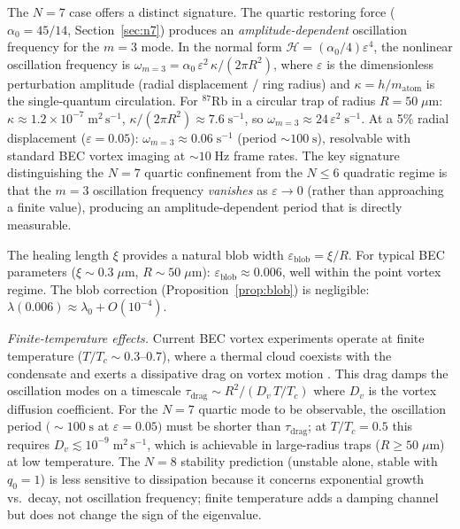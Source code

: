 The $N = 7$ case offers a distinct signature.  The quartic restoring
force ($\alpha_0 = 45/14$, Section~\ref{sec:n7}) produces an
\emph{amplitude-dependent} oscillation frequency for the $m = 3$ mode.
In the normal form $\mathcal{H} = (\alpha_0/4)\varepsilon^4$, the
nonlinear oscillation frequency is
$\omega_{m=3} = \alpha_0\,\varepsilon^2\,\kappa/(2\pi R^2)$, where
$\varepsilon$ is the dimensionless perturbation amplitude (radial
displacement / ring radius) and $\kappa = h/m_{\mathrm{atom}}$ is the
single-quantum circulation.  For $^{87}$Rb in a circular trap of
radius $R = 50\;\mu\mathrm{m}$:
$\kappa \approx 1.2\times 10^{-7}\;\mathrm{m^2\,s^{-1}}$,
$\kappa/(2\pi R^2) \approx 7.6\;\mathrm{s^{-1}}$, so
$\omega_{m=3} \approx 24\,\varepsilon^2\;\mathrm{s^{-1}}$.  At a
5\% radial displacement ($\varepsilon = 0.05$):
$\omega_{m=3} \approx 0.06\;\mathrm{s^{-1}}$ (period $\sim\!100\;\mathrm{s}$),
resolvable with standard BEC vortex imaging at $\sim\!10\;\mathrm{Hz}$
frame rates.  The key signature distinguishing the $N = 7$
quartic confinement from the $N \le 6$ quadratic regime is that the
$m = 3$ oscillation frequency \emph{vanishes} as $\varepsilon \to 0$
(rather than approaching a finite value), producing an
amplitude-dependent period that is directly measurable.

The healing length $\xi$ provides a natural blob width
$\varepsilon_{\mathrm{blob}} = \xi/R$.  For typical BEC parameters
($\xi \sim 0.3\;\mu\mathrm{m}$, $R \sim 50\;\mu\mathrm{m}$):
$\varepsilon_{\mathrm{blob}} \approx 0.006$, well within the point
vortex regime.  The blob correction (Proposition~\ref{prop:blob}) is
negligible: $\lambda(0.006) \approx \lambda_0 + O(10^{-4})$.

\emph{Finite-temperature effects.}  Current BEC vortex experiments
operate at finite temperature ($T/T_c \sim 0.3$--$0.7$), where a
thermal cloud coexists with the condensate and exerts a dissipative
drag on vortex motion \citep{Fetter2009}.  This drag damps the
oscillation modes on a timescale $\tau_{\mathrm{drag}} \sim
R^2/(D_v\,T/T_c)$ where $D_v$ is the vortex diffusion coefficient.
For the $N = 7$ quartic mode to be observable, the oscillation period
$(\sim\!100\;\mathrm{s}$ at $\varepsilon = 0.05)$ must be shorter than
$\tau_{\mathrm{drag}}$; at $T/T_c = 0.5$ this requires
$D_v \lesssim 10^{-9}\;\mathrm{m^2\,s^{-1}}$, which is achievable in
large-radius traps ($R \ge 50\;\mu\mathrm{m}$) at low temperature.
The $N = 8$ stability prediction (unstable alone, stable with $q_0 = 1$)
is less sensitive to dissipation because it concerns exponential growth
vs.\ decay, not oscillation frequency; finite temperature adds a damping
channel but does not change the sign of the eigenvalue.

